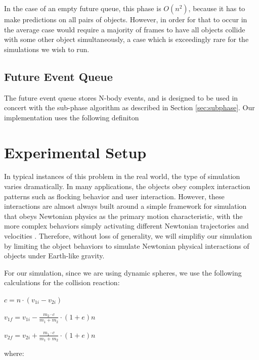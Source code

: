 \documentclass[conference]{IEEEtran}
\begin{document}
In the case of an empty future queue, this phase is $O(n^2)$, because it has to make predictions on all pairs of objects.  However, in order for that to occur in the average case would require a majority of frames to have all objects collide
with some other object simultaneously, a case which is exceedingly rare for the simulations we wish to run.

\subsection{Future Event Queue}
\label{feq}
The future event queue stores N-body events, and is designed to be used in concert with the sub-phase algorithm as described in Section \ref{sec:subphase}.
Our implementation uses the following definiton 

\section{Experimental Setup}%

In typical instances of this problem in the real world, the type of simulation varies dramatically. In many applications, the objects obey complex interaction patterns such as flocking behavior and user interaction.  However, these interactions are almost always built around a simple framework for simulation that obeys Newtonian physics as the primary motion characteristic, with the more complex
behaviors simply activating different Newtonian trajectories and velocities \cite{Jadbabaie02coordinationof}.  Therefore, without loss of generality, we will simplifiy our simulation by limiting the object behaviors to simulate Newtonian physical interactions of objects under Earth-like gravity.

For our simulation, since we are using dynamic spheres, we use the following calculations for the collision reaction\cite{wheatchex}:

\begin{math}
c = n \cdot (v_{1i} - v_{2i})
\end{math}

\begin{math}
v_{1f} = v_{1i} - \frac{m_2 \cdot c}{m_1 + m_2} \cdot (1 + e)n
\end{math}

\begin{math}
v_{2f} = v_{2i} + \frac{m_1 \cdot c}{m_1 + m_2} \cdot (1 + e)n
\end{math}

where:
\end{document}
